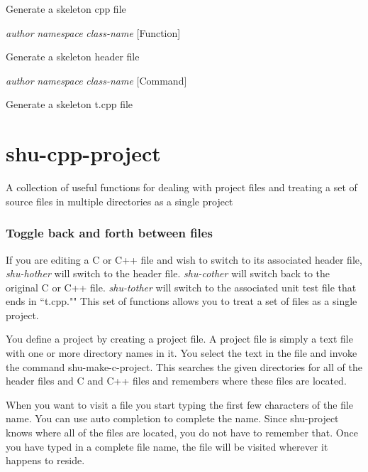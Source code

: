 \begin{doc-string}
Generate a skeleton cpp file
\end{doc-string}

\vspace{1em}
\noindent
{}
\usebox{\funcname}\emph{author} \emph{namespace} \emph{class-name}
 \hfill [Function]

\begin{doc-string}
Generate a skeleton header file
\end{doc-string}

\vspace{1em}
\noindent
{}
\usebox{\funcname}\emph{author} \emph{namespace} \emph{class-name}
 \hfill [Command]

\begin{doc-string}
Generate a skeleton t.cpp file
\end{doc-string}

\eject
\section{shu-cpp-project}


A collection of useful functions for dealing with project files and treating
a set of source files in multiple directories as a single project

\subsubsection{Toggle back and forth between files}

If you are editing a C or C++ file and wish to switch to its associated
header file, \emph{shu-hother} will switch to the header file.  \emph{shu-cother} will
switch back to the original C or C++ file.  \emph{shu-tother} will switch to the
associated unit test file that ends in ``t.cpp.""
This set of functions allows you to treat a set of files as a single project.

You define a project by creating a project file.  A project file is simply a
text file with one or more directory names in it.  You select the text in the
file and invoke the command shu-make-c-project.  This searches the given
directories for all of the header files and C and C++ files and remembers
where these files are located.

When you want to visit a file you start typing the first few characters of the
file name.  You can use auto completion to complete the name.  Since
shu-project knows where all of the files are located, you do not have to
remember that.  Once you have typed in a complete file name, the file will be
visited wherever it happens to reside.


